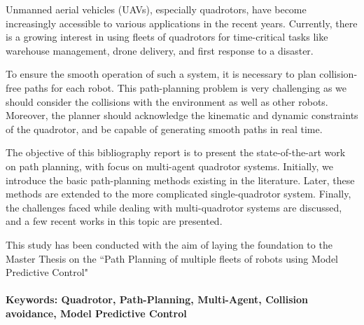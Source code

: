 Unmanned aerial vehicles (UAVs), especially quadrotors, have become increasingly accessible to various applications in the recent years. Currently, there is a growing interest in using fleets of quadrotors for time-critical tasks like warehouse management, drone delivery, and first response to a disaster. 

To ensure the smooth operation of such a system, it is necessary to plan collision-free paths for each robot.  This path-planning problem is very challenging as we should consider the collisions with the environment as well as other robots. Moreover, the planner should acknowledge the kinematic and dynamic constraints of the quadrotor, and be capable of generating smooth paths in real time. 

The objective of this bibliography report is to present the state-of-the-art work on path planning, with focus on multi-agent quadrotor systems. Initially, we introduce the basic path-planning methods existing in the literature. Later, these methods are extended to the more complicated single-quadrotor system. Finally, the challenges faced while dealing with multi-quadrotor systems are discussed, and a few recent works in this topic are presented. 

This study has been conducted with the aim of laying the foundation to the Master Thesis on the ``Path Planning of multiple fleets of robots using Model Predictive Control" \\\\
%
\textbf{Keywords: Quadrotor, Path-Planning, Multi-Agent, Collision avoidance, Model Predictive Control}
